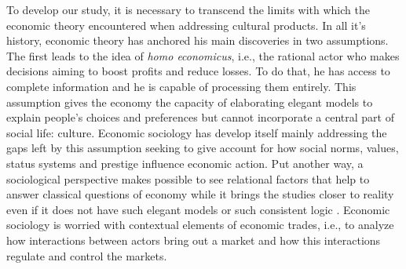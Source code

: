 \documentclass[a4paper, 12pt, openright, oneside, german, french, brazil, english, article]{abntex2}
\begin{document}
	To develop our study, it is necessary to transcend the limits with which the economic theory encountered when addressing cultural products. In all it's history, economic theory has anchored his main discoveries in two assumptions. The first leads to the idea of \textit{homo economicus}, i.e., the rational actor who makes decisions aiming to boost profits and reduce losses. To do that, he has access to complete information and he is capable of processing them entirely. This assumption gives the economy the capacity of elaborating elegant models to explain people's choices and preferences but cannot incorporate a central part of social life: culture. Economic sociology has develop itself mainly addressing the gaps left by this assumption seeking to give account for how social norms, values, status systems and prestige influence economic action. Put another way, a sociological perspective makes possible to see relational factors that help to answer classical questions of economy while it brings the studies closer to reality even if it does not have such elegant models or such consistent logic \cite{hirsch1987dirty}. Economic sociology is worried with contextual elements of economic trades, i.e., to analyze how interactions between actors bring out a market and how this interactions regulate and control the markets.

	
	
\end{document}
